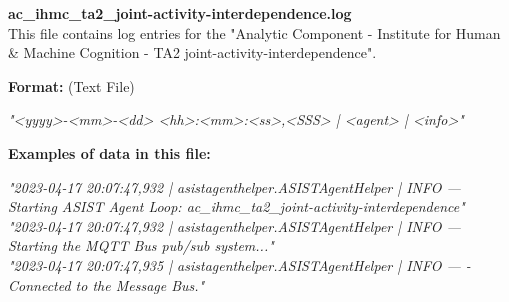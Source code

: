 \begin{description}
\begin{addmargin}[0em]{0em}
    \label{ac_ihmc_ta2_joint-activity-interdependence.log}
    \begin{addmargin}[1em]{0em} %
        \textbf{ac\_ihmc\_ta2\_joint-activity-interdependence.log}\\
        This file contains log entries for the "Analytic Component - Institute for Human \& Machine Cognition - TA2 joint-activity-interdependence".
        \begin{addmargin}[1em]{0em}
            \textbf{Format:} (Text File)
            \begin{addmargin}[1em]{0em}
                \textit{"<yyyy>-<mm>-<dd> <hh>:<mm>:<ss>,<SSS> | <agent> | <info>"}
            \end{addmargin}
        \end{addmargin}
        \begin{addmargin}[1em]{0em}
            \textbf{Examples of data in this file:}
            \begin{addmargin}[1em]{0em}\textit{"2023-04-17 20:07:47,932 | asistagenthelper.ASISTAgentHelper | INFO — Starting ASIST Agent Loop: ac\_ihmc\_ta2\_joint-activity-interdependence"\\
                "2023-04-17 20:07:47,932 | asistagenthelper.ASISTAgentHelper | INFO — Starting the MQTT Bus pub/sub system..."\\
                "2023-04-17 20:07:47,935 | asistagenthelper.ASISTAgentHelper | INFO — - Connected to the Message Bus."}
            \end{addmargin}
        \end{addmargin}
    \end{addmargin} %
    \textbf{\\}


\end{addmargin}
\end{description}
